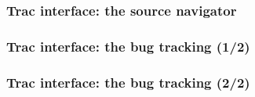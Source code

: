 \documentclass[8pt]{beamer}
\begin{document}
\begin{frame}
  \frametitle{Trac interface: the source navigator}
  \centering {}
\end{frame}
\begin{frame}
  \frametitle{Trac interface: the bug tracking (1/2)}
  \centering {}
\end{frame}
\begin{frame}
  \frametitle{Trac interface: the bug tracking (2/2)}
  \centering {}
\end{frame}
\end{document}
